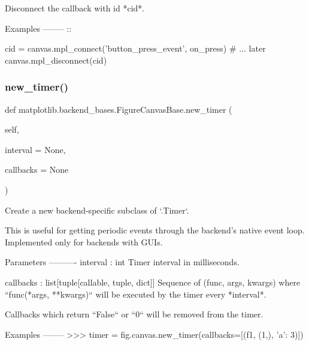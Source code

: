 \begin{DoxyVerb}Disconnect the callback with id *cid*.

Examples
--------
::

    cid = canvas.mpl_connect('button_press_event', on_press)
    # ... later
    canvas.mpl_disconnect(cid)
\end{DoxyVerb}
 \mbox{\label{classmatplotlib_1_1backend__bases_1_1FigureCanvasBase_a05d647b2f0deca6f8bdfd6f66e2a38fa}} 
\subsubsection{\texorpdfstring{new\+\_\+timer()}{new\_timer()}}
{\footnotesize\ttfamily def matplotlib.\+backend\+\_\+bases.\+Figure\+Canvas\+Base.\+new\+\_\+timer (\begin{DoxyParamCaption}\item[{}]{self,  }\item[{}]{interval = {\ttfamily None},  }\item[{}]{callbacks = {\ttfamily None} }\end{DoxyParamCaption})}

\begin{DoxyVerb}Create a new backend-specific subclass of `.Timer`.

This is useful for getting periodic events through the backend's native
event loop.  Implemented only for backends with GUIs.

Parameters
----------
interval : int
    Timer interval in milliseconds.

callbacks : list[tuple[callable, tuple, dict]]
    Sequence of (func, args, kwargs) where ``func(*args, **kwargs)``
    will be executed by the timer every *interval*.

    Callbacks which return ``False`` or ``0`` will be removed from the
    timer.

Examples
--------
>>> timer = fig.canvas.new_timer(callbacks=[(f1, (1,), {'a': 3})])
\end{DoxyVerb}
 \mbox{\label{classmatplotlib_1_1backend__bases_1_1FigureCanvasBase_a132a4afa197d0a77bb594549d4c2dd63}} 
